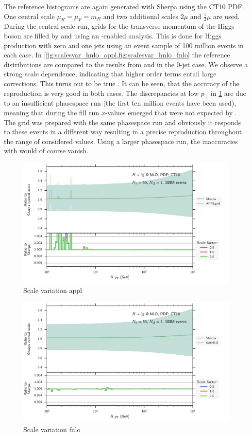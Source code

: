 The reference histograms are again generated with Sherpa using the CT10 PDF.
One central scale $\mu_R = \mu_F = m_H$ and two additional scales $2 \mu$ and $\frac{1}{2} \mu$ are used.
During the central scale run, grids for the transverse momentum of the Higgs boson are filled by \appl{} and \fnlo{} using an \mcgrid{}-enabled \rivet{} analysis.
This is done for Higgs production with zero and one jets using an event sample of 100 million events in each case.
In \cref{fig:scalesvar_hnlo_appl,fig:scalesvar_hnlo_fnlo} the reference distributions are compared to the results from \appl{} and \fnlo{} in the 0-jet case.
We observe a strong scale dependence, indicating that higher order terms entail large corrections.
This turns out to be true \cite{gfusionnnlo1,gfusionnnlo2}.
It can be seen, that the accuracy of the reproduction is very good in both cases.
The discrepancies at low $p_\perp$ in \cref{fig:scalesvar_hnlo_appl} are due to an insufficient phasespace run (the first ten million events have been used), meaning that during the fill run $x$-values emerged that were not expected by \appl{}.
The \fnlo{} grid was prepared with the same phasespace run and obviously it responds to these events in a different way resulting in a precise reproduction throughout the range of considered values.
Using a larger phasespace run, the inaccuracies with \appl{} would of course vanish.
%
\begin{figure}
	\centering
	\includegraphics[width=\textwidth]{images/scalesvar_hnlo_appl.pdf}
	\caption{Scale variation appl}
	\label{fig:scalesvar_hnlo_appl}
\end{figure}
%
\begin{figure}
	\centering
	\includegraphics[width=\textwidth]{images/scalesvar_hnlo_fnlo.pdf}
	\caption{Scale variation fnlo}
	\label{fig:scalesvar_hnlo_fnlo}
\end{figure}
